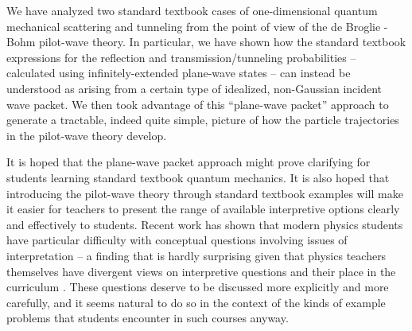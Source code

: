 \documentclass[aps,prc,onecolumn,letterpaper,floatfix,12pt]{revtex4}
\begin{document}
We have analyzed two standard textbook cases of one-dimensional
quantum mechanical scattering and tunneling from the point of view of the de
Broglie - Bohm pilot-wave theory.  In particular, we have shown how
the standard textbook expressions for the reflection and
transmission/tunneling probabilities -- calculated using
infinitely-extended plane-wave states -- can instead be understood as arising
from a certain type of idealized, non-Gaussian incident wave packet.  We then
took advantage of this ``plane-wave packet'' approach to generate a
tractable, indeed quite simple, picture of how the particle
trajectories in the pilot-wave theory develop.  

It is hoped that the plane-wave packet approach might prove
clarifying for students learning standard textbook quantum mechanics.
It is also hoped that introducing the pilot-wave theory
through standard textbook examples will make it easier for teachers to
present the range of available interpretive options clearly and effectively to
students.  Recent work has shown that modern physics students have particular
difficulty with conceptual questions involving issues of
interpretation \cite{wuttiprom} -- a finding that is hardly surprising
given that physics teachers themselves have divergent views on
interpretive questions and their place in the curriculum \cite{baily}.
These questions deserve to be discussed more explicitly
and more carefully, and it seems natural to do so in the context of
the kinds of example problems that students encounter in such courses
anyway.  
\end{document}
